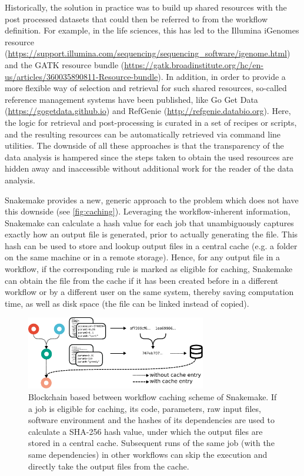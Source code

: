 \documentclass[parskip=half]{scrartcl}
\let\plainurl\url
\renewcommand{\url}[1]{\protect\plainurl{#1}}
\begin{document}
Historically, the solution in practice was to build up shared resources with the post processed datasets that could then be referred to from the workflow definition.
For example, in the life sciences, this has led to the Illumina iGenomes resource (\url{https://support.illumina.com/sequencing/sequencing\_software/igenome.html}) and the GATK resource bundle (\url{https://gatk.broadinstitute.org/hc/en-us/articles/360035890811-Resource-bundle}).
In addition, in order to provide a more flexible way of selection and retrieval for such shared resources, so-called reference management systems have been published, like Go Get Data (\url{https://gogetdata.github.io}) and RefGenie (\url{http://refgenie.databio.org}).
Here, the logic for retrieval and post-processing is curated in a set of recipes or scripts, and the resulting resources can be automatically retrieved via command line utilities.
The downside of all these approaches is that the transparency of the data analysis is hampered since the steps taken to obtain the used resources are hidden away and inaccessible without additional work for the reader of the data analysis.

Snakemake provides a new, generic approach to the problem which does not have this downside (see \autoref{fig:caching}).
Leveraging the workflow-inherent information, Snakemake can calculate a hash value for each job that unambiguously captures exactly how an output file is generated, prior to actually generating the file.
This hash can be used to store and lookup output files in a central cache (e.g. a folder on the same machine or in a remote storage).
Hence, for any output file in a workflow, if the corresponding rule is marked as eligible for caching, Snakemake can obtain the file from the cache if it has been created before in a different workflow or by a different user on the same system, thereby saving computation time, as well as disk space (the file can be linked instead of copied).

\begin{figure}
	\centering
	\includegraphics[width=0.7\textwidth]{caching.pdf}
	\caption{
		Blockchain based between workflow caching scheme of Snakemake.
		If a job is eligible for caching, its code, parameters, raw input files, software environment and the hashes of its dependencies are used to calculate a SHA-256 hash value, under which the output files are stored in a central cache.
		Subsequent runs of the same job (with the same dependencies) in other workflows can skip the execution and directly take the output files from the cache.
	}
	\label{fig:caching}
\end{figure}
\end{document}
